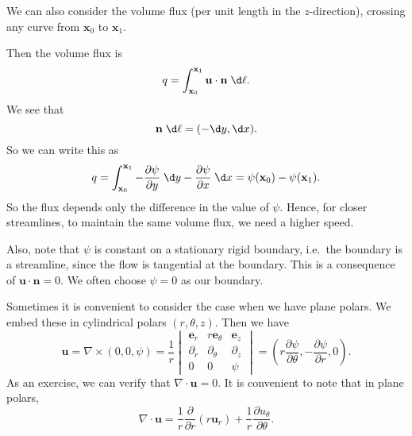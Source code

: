 \documentclass[a4paper]{article}
\begin{document}
We can also consider the volume flux (per unit length in the $z$-direction), crossing any curve from $\mathbf{x}_0$ to $\mathbf{x}_1$.
\begin{center}
\end{center}
Then the volume flux is
\[
  q = \int_{\mathbf{x}_0}^{\mathbf{x}_1} \mathbf{u}\cdot \mathbf{n}\;\d \ell.
\]
We see that
\[
  \mathbf{n}\;\d \ell = (-\d y, \d x).
\]
So we can write this as
\[
  q = \int_{\mathbf{x}_0}^{\mathbf{x}_1} -\frac{\partial \psi}{\partial y}\;\d y - \frac{\partial \psi}{\partial x}\;\d x = \psi(\mathbf{x}_0) - \psi(\mathbf{x}_1).
\]
So the flux depends only the difference in the value of $\psi$. Hence, for closer streamlines, to maintain the same volume flux, we need a higher speed.

Also, note that $\psi$ is constant on a stationary rigid boundary, i.e.\ the boundary is a streamline, since the flow is tangential at the boundary. This is a consequence of $\mathbf{u}\cdot \mathbf{n} = 0$. We often choose $\psi = 0$ as our boundary.

Sometimes it is convenient to consider the case when we have plane polars. We embed these in cylindrical polars $(r, \theta, z)$. Then we have
\[
  \mathbf{u} = \nabla \times (0, 0, \psi) = \frac{1}{r}
  \begin{vmatrix}
    \mathbf{e}_r & r \mathbf{e}_\theta & \mathbf{e}_z\\
    \partial_r & \partial_\theta & \partial_z\\
    0 & 0 & \psi
  \end{vmatrix}
  =\left(r \frac{\partial \psi}{\partial \theta}, -\frac{\partial \psi}{\partial r}, 0\right).
\]
As an exercise, we can verify that $\nabla \cdot \mathbf{u} = 0$. It is convenient to note that in plane polars,
\[
  \nabla \cdot \mathbf{u} = \frac{1}{r} \frac{\partial}{\partial r} (r \mathbf{u}_r) + \frac{1}{r} \frac{\partial u_\theta}{\partial \theta}.
\]
\end{document}
